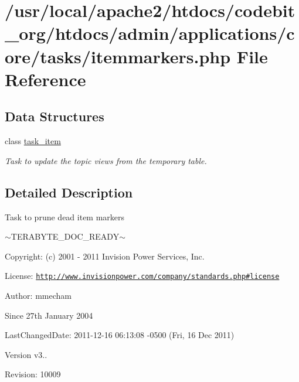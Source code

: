 \hypertarget{itemmarkers_8php}{\section{/usr/local/apache2/htdocs/codebit\-\_\-org/htdocs/admin/applications/core/tasks/itemmarkers.php File Reference}
\label{itemmarkers_8php}
}
\subsection*{Data Structures}
\begin{DoxyCompactItemize}
\item 
class \hyperlink{classtask__item}{task\-\_\-item}
\begin{DoxyCompactList}\small\item\em Task to update the topic views from the temporary table. \end{DoxyCompactList}\end{DoxyCompactItemize}


\subsection{Detailed Description}
\begin{DoxyVerb}  Task to prune dead item markers
\end{DoxyVerb}
 $\sim$\-T\-E\-R\-A\-B\-Y\-T\-E\-\_\-\-D\-O\-C\-\_\-\-R\-E\-A\-D\-Y$\sim$ \begin{DoxyParagraph}{Copyright\-:}
(c) 2001 -\/ 2011 Invision Power Services, Inc.
\end{DoxyParagraph}
\begin{DoxyParagraph}{License\-:}
\href{http://www.invisionpower.com/company/standards.php#license}{\tt http\-://www.\-invisionpower.\-com/company/standards.\-php\#license}
\end{DoxyParagraph}
\begin{DoxyParagraph}{Author\-:}
mmecham 
\end{DoxyParagraph}
\begin{DoxySince}{Since}
27th January 2004 
\end{DoxySince}
\begin{DoxyParagraph}{Last\-Changed\-Date\-:}
2011-\/12-\/16 06\-:13\-:08 -\/0500 (Fri, 16 Dec 2011) 
\end{DoxyParagraph}
\begin{DoxyVersion}{Version}
v3.. 
\end{DoxyVersion}
\begin{DoxyParagraph}{Revision\-:}
10009 
\end{DoxyParagraph}
